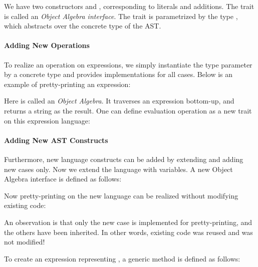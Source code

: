 We have two constructors  and , corresponding to literals and additions. The trait  is called an \textit{Object Algebra interface}. The trait is parametrized by the type
, which abstracts over the concrete type of the AST.

\paragraph{Adding New Operations}
To realize an operation on expressions, we simply instantiate the type parameter by a concrete type and
provides implementations for all cases. Below is an example of pretty-printing an expression:

Here  is called an \textit{Object Algebra}. It traverses an expression bottom-up, and returns a string as the result.
One can define evaluation operation as a new trait on this expression language:


\paragraph{Adding New AST Constructs}
Furthermore, new language constructs can be added by extending  and adding new cases only. Now we extend the language
with variables. A new Object Algebra interface  is defined as follows:

Now pretty-printing on the new language can be realized without modifying existing code:

An observation is that only the new case is implemented for pretty-printing, and the others have been inherited.
In other words, existing code was reused and was not modified!

To create an expression representing , a generic method is defined as follows:


